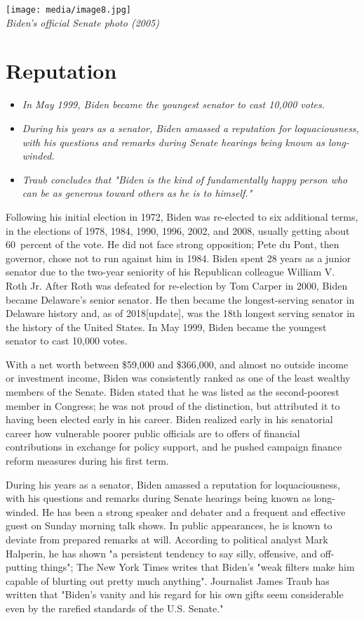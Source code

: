 \texttt{[image: media/image8.jpg]}\\
\emph{Biden's official Senate photo (2005)}

\section{Reputation}\label{reputation}

\begin{itemize}
\item
  \emph{In May 1999, Biden became the youngest senator to cast 10,000
  votes.}
\item
  \emph{During his years as a senator, Biden amassed a reputation for
  loquaciousness, with his questions and remarks during Senate hearings
  being known as long-winded.}
\item
  \emph{Traub concludes that "Biden is the kind of fundamentally happy
  person who can be as generous toward others as he is to himself."}
\end{itemize}

Following his initial election in 1972, Biden was re-elected to six
additional terms, in the elections of 1978, 1984, 1990, 1996, 2002, and
2008, usually getting about 60~percent of the vote. He did not face
strong opposition; Pete du Pont, then governor, chose not to run against
him in 1984. Biden spent 28 years as a junior senator due to the
two-year seniority of his Republican colleague William V. Roth Jr. After
Roth was defeated for re-election by Tom Carper in 2000, Biden became
Delaware's senior senator. He then became the longest-serving senator in
Delaware history and, as of 2018{[}update{]}, was the 18th longest
serving senator in the history of the United States. In May 1999, Biden
became the youngest senator to cast 10,000 votes.

With a net worth between \$59,000 and \$366,000, and almost no outside
income or investment income, Biden was consistently ranked as one of the
least wealthy members of the Senate. Biden stated that he was listed as
the second-poorest member in Congress; he was not proud of the
distinction, but attributed it to having been elected early in his
career. Biden realized early in his senatorial career how vulnerable
poorer public officials are to offers of financial contributions in
exchange for policy support, and he pushed campaign finance reform
measures during his first term.

During his years as a senator, Biden amassed a reputation for
loquaciousness, with his questions and remarks during Senate hearings
being known as long-winded. He has been a strong speaker and debater and
a frequent and effective guest on Sunday morning talk shows. In public
appearances, he is known to deviate from prepared remarks at will.
According to political analyst Mark Halperin, he has shown "a persistent
tendency to say silly, offensive, and off-putting things"; The New York
Times writes that Biden's "weak filters make him capable of blurting out
pretty much anything". Journalist James Traub has written that "Biden's
vanity and his regard for his own gifts seem considerable even by the
rarefied standards of the U.S. Senate."

